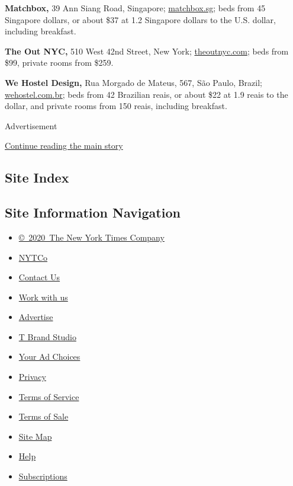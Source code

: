 \textbf{Matchbox,} 39 Ann Siang Road, Singapore;
\href{http://matchbox.sg}{matchbox.sg}; beds from 45 Singapore dollars,
or about \$37 at 1.2 Singapore dollars to the U.S. dollar, including
breakfast.

\textbf{The Out NYC,} 510 West 42nd Street, New York;
\href{http://theoutnyc.com}{theoutnyc.com}; beds from \$99, private
rooms from \$259.

\textbf{We Hostel Design,} Rua Morgado de Mateus, 567, São Paulo,
Brazil; \href{http://wehostel.com.br}{wehostel.com.br}; beds from 42
Brazilian reais, or about \$22 at 1.9 reais to the dollar, and private
rooms from 150 reais, including breakfast.

Advertisement

\protect\hyperlink{after-bottom}{Continue reading the main story}

\hypertarget{site-index}{%
\subsection{Site Index}\label{site-index}}

\hypertarget{site-information-navigation}{%
\subsection{Site Information
Navigation}\label{site-information-navigation}}

\begin{itemize}
\tightlist
\item
  \href{https://help.nytimes3xbfgragh.onion/hc/en-us/articles/115014792127-Copyright-notice}{©~2020~The
  New York Times Company}
\end{itemize}

\begin{itemize}
\tightlist
\item
  \href{https://www.nytco.com/}{NYTCo}
\item
  \href{https://help.nytimes3xbfgragh.onion/hc/en-us/articles/115015385887-Contact-Us}{Contact
  Us}
\item
  \href{https://www.nytco.com/careers/}{Work with us}
\item
  \href{https://nytmediakit.com/}{Advertise}
\item
  \href{http://www.tbrandstudio.com/}{T Brand Studio}
\item
  \href{https://www.nytimes3xbfgragh.onion/privacy/cookie-policy\#how-do-i-manage-trackers}{Your
  Ad Choices}
\item
  \href{https://www.nytimes3xbfgragh.onion/privacy}{Privacy}
\item
  \href{https://help.nytimes3xbfgragh.onion/hc/en-us/articles/115014893428-Terms-of-service}{Terms
  of Service}
\item
  \href{https://help.nytimes3xbfgragh.onion/hc/en-us/articles/115014893968-Terms-of-sale}{Terms
  of Sale}
\item
  \href{https://spiderbites.nytimes3xbfgragh.onion}{Site Map}
\item
  \href{https://help.nytimes3xbfgragh.onion/hc/en-us}{Help}
\item
  \href{https://www.nytimes3xbfgragh.onion/subscription?campaignId=37WXW}{Subscriptions}
\end{itemize}
